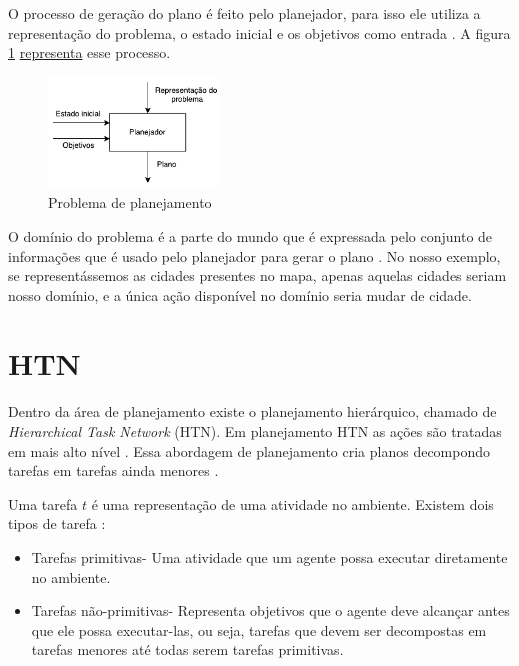 O processo de geração do plano é feito pelo planejador, para isso ele utiliza a representação do problema, o estado inicial e os objetivos como entrada \cite{ghallab2004automated}. A figura \ref{fig:planmodelo} \underline{representa} esse processo. 

\begin{figure}[ht]
	\centering
	\includegraphics[width=0.4\textwidth]{fig/modelo.pdf}
	\caption{Problema de planejamento}
	\label{fig:planmodelo}
\end{figure} 

O domínio do problema é a parte do mundo que é expressada pelo conjunto de informações que é usado pelo planejador para gerar o plano \cite{intelligence2003modern}. 
No nosso exemplo, se representássemos as cidades presentes no mapa, apenas aquelas cidades seriam nosso domínio, e a única ação disponível no domínio seria mudar de cidade.


\section{HTN} 

Dentro da área de planejamento existe o planejamento hierárquico, chamado de \textit{Hierarchical Task Network} (HTN). 
Em planejamento HTN as ações são tratadas em mais alto nível \cite{intelligence2003modern}. 
Essa abordagem de planejamento cria planos decompondo tarefas em tarefas ainda menores \cite{ontanon2015adversarial}.

Uma tarefa $t$ é uma representação de uma atividade no ambiente. Existem dois tipos de tarefa \cite{intelligence2003modern}: 

\begin{itemize}
	\item Tarefas primitivas- Uma atividade que um agente possa executar diretamente no ambiente.
	\item Tarefas não-primitivas- Representa objetivos que o agente deve alcançar antes que ele possa executar-las, ou seja, tarefas que devem ser decompostas em tarefas menores até todas serem tarefas primitivas. 
\end{itemize}

